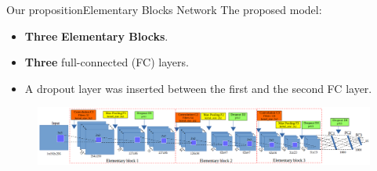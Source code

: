 \documentclass[10pt,svgnames]{beamer}
\begin{document}
\begin{frame}{Our proposition}{Elementary Blocks Network}
	The proposed model: 
		\small{
			\begin{itemize}
				\item \textbf{Three} \textbf{\color{elem}Elementary Blocks}.
    			\item \textbf{Three} {\color{blue}full-connected} (FC) layers.
    			\item A dropout layer was inserted between the first and the second FC layer.
  			\end{itemize}}
  		
    		\begin{center}
     			\begin{figure}[htbp]
        			\centering
        			\includegraphics[scale=.2]{images/arch_model}
				\end{figure}
     		\end{center}
\end{frame}
\end{document}
